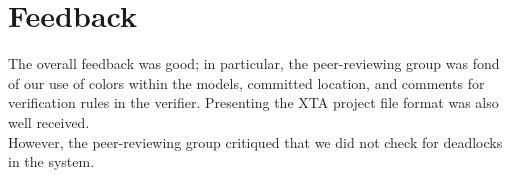 \section{Feedback}

The overall feedback was good; in particular, the peer-reviewing group was fond of our use of colors within the models, committed location, and comments for verification rules in the verifier. Presenting the XTA project file format was also well received. \\
However, the peer-reviewing group critiqued that we did not check for deadlocks in the system.